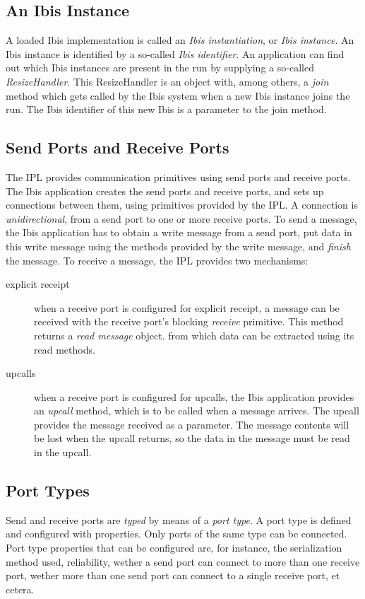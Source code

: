 \documentclass[10pt]{article}
\newcommand{\mysubsection}[1]{\subsection{#1}\label{#1}}
\begin{document}
\mysubsection{An Ibis Instance}

A loaded Ibis implementation is called an \emph{Ibis instantiation}, or 
\emph{Ibis instance}.
An Ibis instance is identified by a so-called
\emph{Ibis identifier}.
An application can find out which Ibis instances are present in the run
by supplying a so-called \emph{ResizeHandler}.
This ResizeHandler is an object with, among others, a \emph{join} method
which gets called by the Ibis system when a new Ibis instance joins the
run.
The Ibis identifier of this new Ibis is a parameter to the join method.

\mysubsection{Send Ports and Receive Ports}

The IPL provides communication primitives using send ports and receive ports.
The Ibis application creates the send ports and receive ports, and sets up
connections between them, using primitives provided by the IPL.
A connection is \emph{unidirectional}, from a send port to one or more
receive ports.
To send a message, the Ibis application has to obtain a
write message from a send port, put data in this write message using
the methods provided by the write message, and \emph{finish} the
message.
To receive a message, the IPL provides two mechanisms:
\begin{description}
\item[explicit receipt]
when a receive port is configured for explicit receipt, a message can be
received with the receive port's blocking \emph{receive} primitive.
This method returns a \emph{read message} object. from which data can
be extracted using its read methods.
\item[upcalls]
when a receive port is configured for upcalls, the Ibis application provides
an \emph{upcall} method, which is to be called when a message arrives.
The upcall provides the message received as a parameter.
The message contents will be lost when the upcall returns, so the data
in the message must be read in the upcall.
\end{description}

\mysubsection{Port Types}

Send and receive ports are \emph{typed} by means of a \emph{port type}.
A port type is defined and configured with properties.
Only ports of the same type can be connected.
Port type properties that can be configured are, for instance, the
serialization method used, reliability, wether a send port can connect
to more than one receive port, wether more than one send port can connect
to a single receive port, et cetera.
\end{document}
